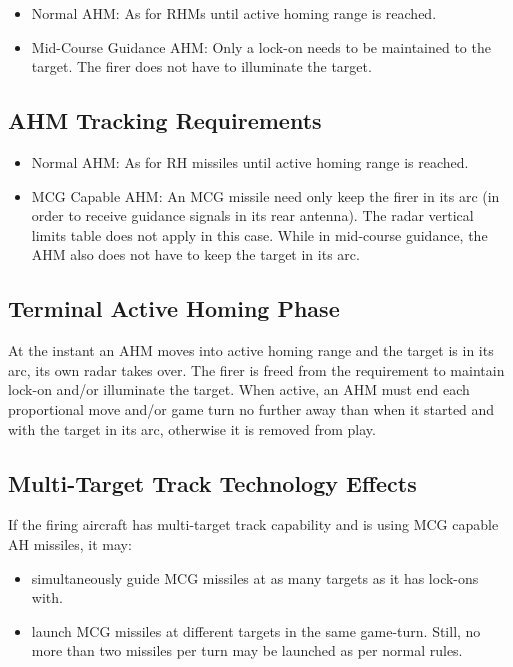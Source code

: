 \begin{itemize}

    \item Normal AHM: As for RHMs until active homing range is reached.

    \item Mid-Course Guidance AHM: Only a lock-on needs to be maintained to the target. The firer does not have to illuminate the target.

\end{itemize}

\subsection{AHM Tracking Requirements}

\begin{itemize}

    \item Normal AHM: As for RH missiles until active homing range is reached.

    \item MCG Capable AHM: An MCG missile need only keep the firer in its  arc (in order to receive guidance signals in its rear antenna). The radar vertical limits table does not apply in this case. While in mid-course guidance, the AHM also does not have to keep the target in its  arc.

\end{itemize}

\subsection{Terminal Active Homing Phase} At the instant an AHM moves into active homing range and the target is in its  arc, its own radar takes over. The firer is freed from the requirement to maintain lock-on and/or illuminate the target.  When active, an AHM must end each proportional move and/or game turn no further away than when it started and with the target in its  arc, otherwise it is removed from play.

\subsection{Multi-Target Track Technology Effects} If the firing aircraft has multi-target track capability and is using MCG capable AH missiles, it may:

\begin{itemize}

    \item simultaneously guide MCG missiles at as many targets as it has lock-ons with.

    \item launch MCG missiles at different targets in the same game-turn. Still, no more than two missiles per turn may be launched as per normal rules.

\end{itemize}

